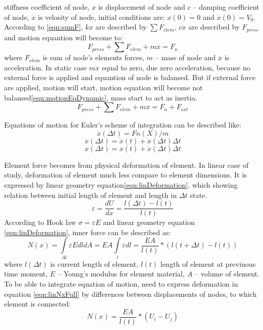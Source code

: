 stiffness coefficient of node, $x$ is displacement of node and $c$ – damping coefficient of node,
$\dot{x}$ is velosity of node, initial conditions are: $x(0)=0$ and $\dot{x}(0)=V_0$. According to
\ref{eqn:sumF}, $kx$ are described by $\sum{F_{elem}}$, $c\dot{x}$ are described by $F_{press}$ and
motion equantion will become to:
\begin{equation}\label{eqn:motionEqNodeStatic}
  F_{press} + \sum{F_{elem}} + m\ddot{x} = F_n
\end{equation}
where $F_{elem}$ is sum of node's elements forces, $m$ – mass of node and $\ddot{x}$ is
acceleration. In static case $m\ddot{x}$ equal to zero, due zero acceleration, because no external
force is applied and equantion of node is balansed. But if external force are applied, motion will
start, motion equation will become not balansed\ref{eqn:motionEqDynamic}, mass start to act as inertia. 
\begin{equation}\label{eqn:motionEqDynamic}
  F_{press} + \sum{F_{elem}} + m\ddot{x} = F_n + F_{ext}
\end{equation}\par 
Equations of motion for Euler's scheme of integration can be described like:
\begin{equation}\label{eqn:Accel}
  \ddot{x}(\Delta t)=Fn(X)/m
\end{equation}
\begin{equation}\label{eqn:Velos}
  \dot{x}(\Delta t)=\dot{x}(t)+\ddot{x}(\Delta t)\Delta t
\end{equation}
\begin{equation}\label{eqn:Displ}
  x(\Delta t)=x(t)+\dot{x}(\Delta t)\Delta t
\end{equation}
\par Element force becomes from physical deformation of
element. In linear case of study, deformation of element much less compare to
element dimensions. It is expressed by linear geometry
equation\eqref{eqn:linDeformation}, which showing relation between initial
length of element and length in $\Delta t$ state.
\begin{equation}\label{eqn:linDeformation}
  \varepsilon=\frac{dU}{dx}=\frac{l(\Delta t)-l(t)}{l(t)}
\end{equation}
According to Hook law $\sigma=\varepsilon E$ and linear geometry equation
\eqref{eqn:linDeformation}, inner force can be described as:
\begin{equation}\label{eqn:linNxFull}
  N(x)= \int\limits_{Al} \varepsilon EdldA=EA\int\limits_l \varepsilon dl=\frac{EA}{l(t)}*(l(t + \Delta t)-l(t))
\end{equation}
where $l(\Delta t)$ is current length of element, $l(t)$ length of element at previuous time moment,
$E$ – Young’s modulus for element material, $A$ – volume of element. To be able to integrate
equation of motion, need to express deformation in equation \eqref{eqn:linNxFull} by differences
between displacements of nodes, to which element is connected:
\begin{equation}\label{eqn:linNxWdispl}
  N(x)=\frac{EA}{l(t)}*(U_{i}-U_{j})
\end{equation}\par
